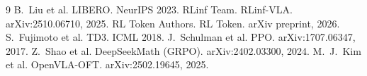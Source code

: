 \documentclass[11pt]{article}
\begin{document}
\begin{thebibliography}{9}
 B.~Liu et al. {LIBERO}. NeurIPS 2023.
 RLinf Team. {RLinf-VLA}. arXiv:2510.06710, 2025.
 RL Token Authors. {RL Token}. arXiv preprint, 2026.
 S.~Fujimoto et al. TD3. ICML 2018.
 J.~Schulman et al. PPO. arXiv:1707.06347, 2017.
 Z.~Shao et al. DeepSeekMath (GRPO). arXiv:2402.03300, 2024.
 M.~J.~Kim et al. OpenVLA-OFT. arXiv:2502.19645, 2025.
\end{thebibliography}
\end{document}
